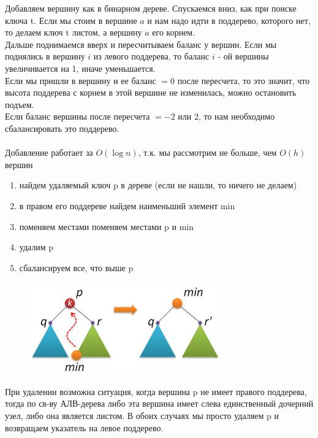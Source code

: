 \documentclass[discrete.tex]{subfiles}
\begin{document}
\begin{definition} 
    Добавляем вершину как в бинарном дереве. Спускаемся вниз, как при поиске ключа t.
    Если мы стоим в вершине $a$ и нам надо идти в поддерево, которого нет, то делаем 
    ключ t листом, а вершину $a$ его корнем. \\
    Дальше поднимаемся вверх и пересчитываем баланс у вершин. 
    Если мы поднялись в вершину $i$ из левого поддерева, то 
    баланс $i$ - ой вершины увеличивается на 1, иначе уменьшается.\\
    Если мы пришли в 
    вершину и ее баланс $ = 0$ после пересчета, то это значит, что высота поддерева с 
    корнем в этой вершине не изменилась, можно остановить подъем.\\
    Если баланс вершины после пересчета $= -2 $ или $ 2$, то нам необходимо сбалансировать
    это поддерево.\\
    \\
    Добавление работает за $O(\log n)$, т.к. мы рассмотрим не больше, чем $O(h)$ 
    вершин

\end{definition}

\begin{definition} 
    \begin{enumerate}
        \item найдем удаляемый ключ p в дереве (если не нашли, то ничего не делаем)
        \item в правом его поддереве найдем наименьший элемент min
        \item поменяем местами поменяем местами p и min
        \item удалим p
        \item сбалансируем все, что выше p
    \end{enumerate}
    \begin{figure}[H]
            \includegraphics[scale=0.5]{pics/33_4.jpg}
            \centering
    \end{figure}
    При удалении возможна ситуация, когда вершина p не имеет правого поддерева, тогда
    по св-ву АЛВ-дерева либо эта вершина имеет слева единственный дочерний узел,
    либо она является листом. В обоих случаях мы просто удаляем p и возвращаем указатель
    на левое поддерево.
\end{definition}
\end{document}
